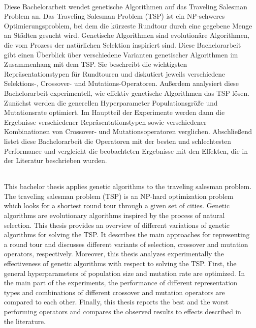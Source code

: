 \renewenvironment{abstract}
{\vspace*{\fill}
  {\bfseries\abstractname}\\[5mm]}
{\vfill}

\begin{abstract}
  Diese Bachelorarbeit wendet genetische Algorithmen auf das Traveling Salesman Problem an. Das Traveling Salesman Problem (TSP) ist ein NP-schweres Optimierungsproblem, bei dem die kürzeste Rundtour durch eine gegebene Menge an Städten gesucht wird. Genetische Algorithmen sind evolutionäre Algorithmen, die vom Prozess der natürlichen Selektion inspiriert sind. Diese Bachelorarbeit gibt einen Überblick über verschiedene Varianten genetischer Algorithmen im Zusammenhang mit dem TSP. Sie beschreibt die wichtigsten Repräsentationstypen für Rundtouren und diskutiert jeweils verschiedene Selektions-, Crossover- und Mutations-Operatoren. Außerdem analysiert diese Bachelorarbeit experimentell, wie effektiv genetische Algorithmen das TSP lösen. Zunächst werden die generellen Hyperparameter Populationsgröße und Mutationsrate optimiert. Im Hauptteil der Experimente werden dann die Ergebnisse verschiedener Repräsentationstypen sowie verschiedener Kombinationen von Crossover- und Mutationsoperatoren verglichen. Abschließend listet diese Bachelorarbeit die Operatoren mit der besten und schlechtesten Performance und vergleicht die beobachteten Ergebnisse mit den Effekten, die in der Literatur beschrieben wurden.
\end{abstract}

\begin{abstract}
  This bachelor thesis applies genetic algorithms to the traveling salesman problem. The traveling salesman problem (TSP) is an NP-hard optimization problem which looks for a shortest round tour through a given set of cities. Genetic algorithms are evolutionary algorithms inspired by the process of natural selection. This thesis provides an overview of different variations of genetic algorithms for solving the TSP. It describes the main approaches for representing a round tour and discusses \mbox{different} variants of selection, crossover and mutation operators, respectively. Moreover, this thesis \mbox{analyzes} experimentally the effectiveness of genetic algorithms with respect to solving the TSP. First, the general hyperparameters of population size and mutation rate are optimized. In the main part of the experiments, the performance of different representation types and combinations of different crossover and mutation operators are compared to each other. Finally, this thesis reports the best and the worst performing operators and compares the observed results to effects described in the literature.
\end{abstract} 
